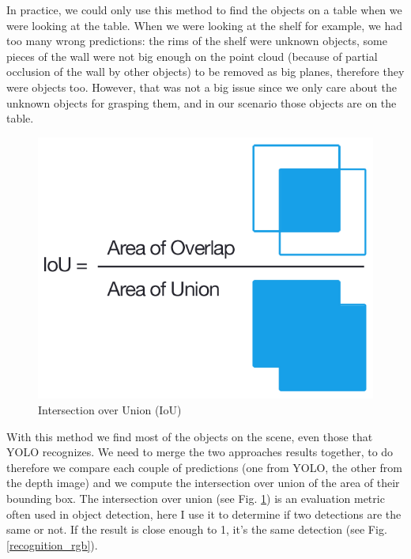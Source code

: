 \documentclass[a4paper, twocolumn]{article}
\begin{document}
    In practice, we could only use this method to find the objects on a table when we were looking at the table. When we were looking at the shelf for example, we had too many wrong predictions: the rims of the shelf were unknown objects, some pieces of the wall were not big enough on the point cloud (because of partial occlusion of the wall by other objects) to be removed as big planes, therefore they were objects too. However, that was not a big issue since we only care about the unknown objects for grasping them, and in our scenario those objects are on the table.
    
    \begin{figure}[!b]
        \includegraphics[width=\columnwidth]{../img/iou_equation.png}
        \caption{Intersection over Union (IoU)}
        \label{IoU}
    \end{figure}

    With this method we find most of the objects on the scene, even those that YOLO recognizes. We need to merge the two approaches results together, to do therefore we compare each couple of predictions (one from YOLO, the other from the depth image) and we compute the intersection over union of the area of their bounding box. The intersection over union (see Fig. \ref{IoU}) is an evaluation metric often used in object detection, here I use it to determine if two detections are the same or not. If the result is close enough to 1, it's the same detection (see Fig. \ref{recognition_rgb}).
\end{document}
